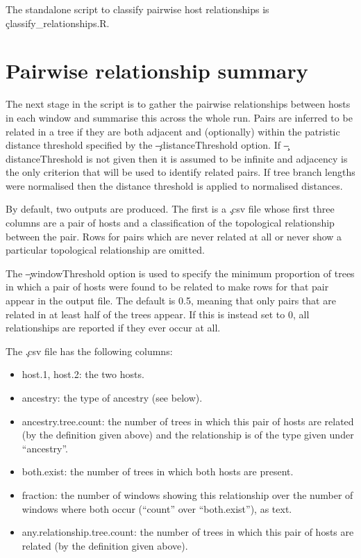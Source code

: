 The standalone script to classify pairwise host relationships is \c{classify\_relationships.R}.

\section{Pairwise relationship summary}\label{sec:ClassificationSummary}

The next stage in the script is to gather the pairwise relationships between hosts in each window and summarise this across the whole run.
Pairs are inferred to be related in a tree if they are both adjacent and (optionally) within the patristic distance threshold specified by the \c{--distanceThreshold} option.
If \c{--distanceThreshold} is not given then it is assumed to be infinite and adjacency is the only criterion that will be used to identify related pairs.
If tree branch lengths were normalised then the distance threshold is applied to normalised distances.

By default, two outputs are produced. The first is a \c{.csv} file whose first three columns are a pair of hosts and a classification of the topological relationship between the pair.
Rows for pairs which are never related at all or never show a particular topological relationship are omitted.

The \c{--windowThreshold} option is used to specify the minimum proportion of trees in which a pair of hosts were found to be related to make rows for that pair appear in the output file. The default is 0.5, meaning that only pairs that are related in at least half of the trees appear. If this is instead set to 0, all relationships are reported if they ever occur at all.

The \c{.csv} file has the following columns:
\begin{itemize}
\item host.1, host.2: the two hosts.
\item ancestry: the type of ancestry (see below).
\item ancestry.tree.count: the number of trees in which this pair of hosts are related (by the definition given above) and the relationship is of the type given under ``ancestry''.
\item both.exist: the number of trees in which both hosts are present.
\item fraction: the number of windows showing this relationship over the number of windows where both occur (``count'' over ``both.exist''), as text.
\item any.relationship.tree.count: the number of trees in which this pair of hosts are related (by the definition given above).
\end{itemize}

